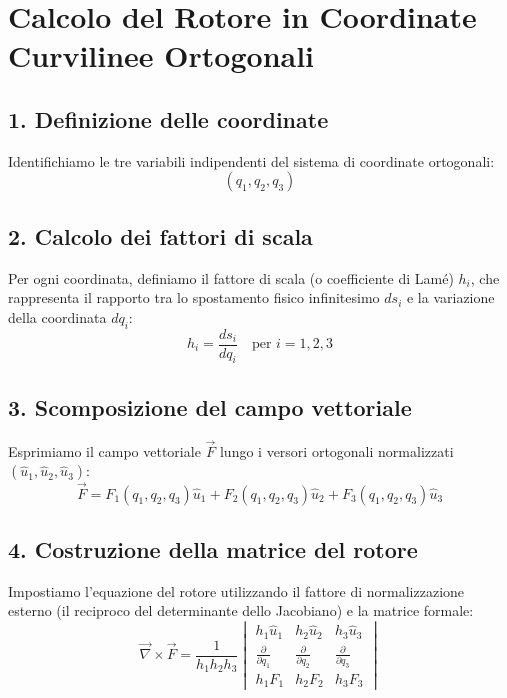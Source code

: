 \documentclass[11pt, a4paper]{article}
\begin{document}
 
\section*{Calcolo del Rotore in Coordinate Curvilinee Ortogonali}

\subsection*{1. Definizione delle coordinate}
Identifichiamo le tre variabili indipendenti del sistema di coordinate ortogonali:
\begin{equation*}
    (q_1, q_2, q_3)
\end{equation*}

\subsection*{2. Calcolo dei fattori di scala}
Per ogni coordinata, definiamo il fattore di scala (o coefficiente di Lamé) $h_i$, che rappresenta il rapporto tra lo spostamento fisico infinitesimo $ds_i$ e la variazione della coordinata $dq_i$:
\begin{equation*}
    h_i = \frac{ds_i}{dq_i} \quad \text{per } i=1,2,3
\end{equation*}

\subsection*{3. Scomposizione del campo vettoriale}
Esprimiamo il campo vettoriale $\vec{F}$ lungo i versori ortogonali normalizzati $(\hat{u}_1, \hat{u}_2, \hat{u}_3)$:
\begin{equation*}
    \vec{F} = F_1(q_1, q_2, q_3) \hat{u}_1 + F_2(q_1, q_2, q_3) \hat{u}_2 + F_3(q_1, q_2, q_3) \hat{u}_3
\end{equation*}

\subsection*{4. Costruzione della matrice del rotore}
Impostiamo l'equazione del rotore utilizzando il fattore di normalizzazione esterno (il reciproco del determinante dello Jacobiano) e la matrice formale:
\begin{equation*}
    \vec{\nabla} \times \vec{F} = \frac{1}{h_1 h_2 h_3} 
    \begin{vmatrix} 
        h_1 \hat{u}_1 & h_2 \hat{u}_2 & h_3 \hat{u}_3 \\ 
        \frac{\partial}{\partial q_1} & \frac{\partial}{\partial q_2} & \frac{\partial}{\partial q_3} \\ 
        h_1 F_1 & h_2 F_2 & h_3 F_3 
    \end{vmatrix}
\end{equation*}
\end{document}
